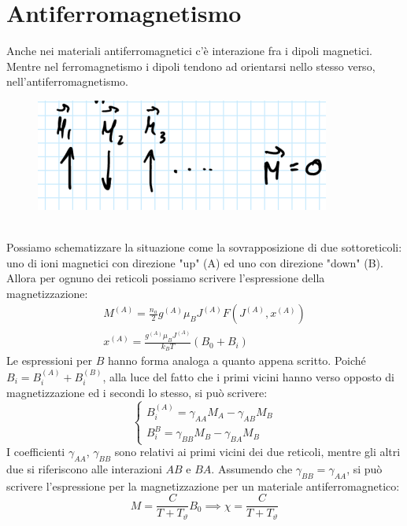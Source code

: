 \documentclass{book}
\begin{document}
    \section{Antiferromagnetismo}
        Anche nei materiali antiferromagnetici c'è interazione fra i dipoli magnetici. Mentre nel ferromagnetismo i dipoli tendono ad orientarsi nello stesso verso, nell'antiferromagnetismo.
        \begin{figure}[h!]
            \centering
            \includegraphics[width=0.5\linewidth]{img/asset6.png}
        \end{figure} \\
        Possiamo schematizzare la situazione come la sovrapposizione di due sottoreticoli: uno di ioni magnetici con direzione "up" (A) ed uno con direzione "down" (B). Allora per ognuno dei reticoli possiamo scrivere l'espressione della magnetizzazione:
        \begin{align}
            M^{(A)} = \frac{n_{a}}{2}g^{(A)} \mu_{B}J^{(A)}F(J^{(A)}, x^{(A)}) \\
            x^{(A)}= \frac{g ^{(A)} \mu_{B} J^{(A)}}{k_{B}T}(B_{0}+B_{i})
        \end{align}
        Le espressioni per $B$ hanno forma analoga a quanto appena scritto. Poiché $B_{i} = B_{i} ^{(A)}+B_{i} ^{(B)}$, alla luce del fatto che i primi vicini hanno verso opposto di magnetizzazione ed i secondi lo stesso, si può scrivere:
        \begin{equation}
            \begin{cases}
                B_{i} ^{(A)} = \gamma_{AA}M_{A}-\gamma_{AB}M_{B} \\
                B_{i} ^{B} = \gamma_{BB}M_{B}-\gamma_{BA}M_{B}
            \end{cases}
        \end{equation} \newpage
        I coefficienti $\gamma_{AA}$, $\gamma_{BB}$ sono relativi ai primi vicini dei due reticoli, mentre gli altri due si riferiscono alle interazioni $AB$ e $BA$. Assumendo che $\gamma_{BB} = \gamma_{AA}$, si può scrivere l'espressione per la magnetizzazione per un materiale antiferromagnetico:
        \begin{equation}
            M = \frac{C}{T+T_{\vartheta}}B_{0} \implies \chi = \frac{C}{T+T_{\vartheta}}
        \end{equation}
\end{document}
